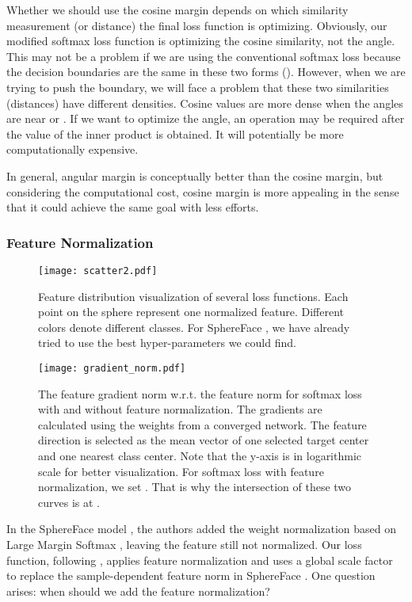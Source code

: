 \documentclass[10pt,twocolumn,letterpaper]{article}
\begin{document}
Whether we should use the cosine margin depends on which similarity measurement (or distance) the final loss function is optimizing. Obviously, our modified softmax loss function is optimizing the cosine similarity, not the angle. This may not be a problem if we are using the conventional softmax loss because the decision boundaries are the same in these two forms (). However, when we are trying to push the boundary, we will face a problem that these two similarities (distances) have different densities. Cosine values are more dense when the angles are near  or . If we want to optimize the angle, an  operation may be required after the value of the inner product  is obtained. It will potentially be more computationally expensive.

In general, angular margin is conceptually better than the cosine margin, but considering the computational cost, cosine margin is more appealing in the sense that it could achieve the same goal with less efforts.

\subsubsection{Feature Normalization}

\begin{figure*}
	\centering
	\texttt{[image: scatter2.pdf]}
	\caption{ Feature distribution visualization of several loss functions. Each point on the sphere represent one normalized feature. Different colors denote different classes. For SphereFace \cite{liu2017sphereface}, we have already tried to use the best hyper-parameters we could find.}
	\label{fig:scatter}
\end{figure*}
\begin{figure}
	\centering
	\texttt{[image: gradient\_norm.pdf]}
	\caption{ The feature gradient norm w.r.t. the feature norm for softmax loss with and without feature normalization. The gradients are calculated using the weights from a converged network. The feature direction is selected as the mean vector of one selected target center and one nearest class center.  Note that the y-axis is in logarithmic scale for better visualization. For softmax loss with feature normalization, we set . That is why the intersection of these two curves is at . }
	\label{fig:gradient_norm}
\end{figure}

In the SphereFace model \cite{liu2017sphereface}, the authors added the weight normalization based on Large Margin Softmax \cite{liu2016large}, leaving the feature still not normalized. Our loss function, following \cite{wang2017normface,liu_2017_coco_v2,ranjan2017l2}, applies feature normalization and uses a global scale factor  to replace the sample-dependent feature norm in SphereFace \cite{liu2017sphereface}. One question arises: when should we add the feature normalization?
\end{document}
